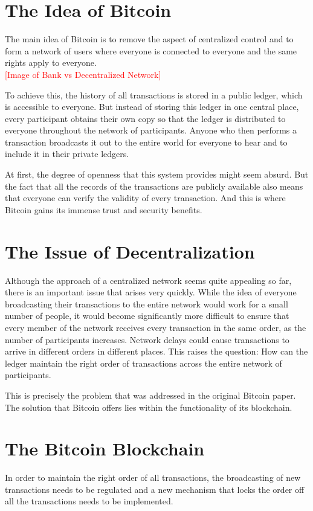 \documentclass[a4paper, 12pt]{report}
\begin{document}
\section{The Idea of Bitcoin}
\par The main idea of Bitcoin is to remove the aspect of centralized control and to form a network of users where everyone is connected to everyone and the same rights apply to everyone.  
\\ \textcolor{red}{[Image of Bank vs Decentralized Network]} \\
\par To achieve this, the history of all transactions is stored in a public ledger, which is accessible to everyone. But instead of storing this ledger in one central place, every participant obtains their own copy so that the ledger is distributed to everyone throughout the network of participants. Anyone who then performs a transaction broadcasts it out to the entire world for everyone to hear and to include it in their private ledgers. 
\par At first, the degree of openness that this system provides might seem absurd. But the fact that all the records of the transactions are publicly available also means that everyone can verify the validity of every transaction. And this is where Bitcoin gains its immense trust and security benefits.

\section{The Issue of Decentralization}
\par Although the approach of a centralized network seems quite appealing so far, there is an important issue that arises very quickly. While the idea of everyone broadcasting their transactions to the entire network would work for a small number of people, it would become significantly more difficult to ensure that every member of the network receives every transaction in the same order, as the number of participants increases. Network delays could cause transactions to arrive in different orders in different places. This raises the question: How can the ledger maintain the right order of transactions across the entire network of participants. 
\par This is precisely the problem that was addressed in the original Bitcoin paper. The solution that Bitcoin offers lies within the functionality of its blockchain.

\section{The Bitcoin Blockchain}
\par In order to maintain the right order of all transactions, the broadcasting of new transactions needs to be regulated and a new mechanism that locks the order off all the transactions needs to be implemented.
\end{document}
